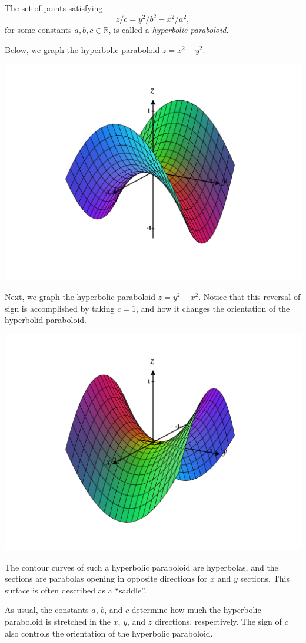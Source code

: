 \documentclass{ximera}
\begin{document}
\begin{example}
The set of points satisfying
\[
z/c = y^2/b^2 - x^2/a^2,
\]
for some constants $a,b,c\in\mathbb{R}$, is called a \emph{hyperbolic paraboloid}.

Below, we graph the hyperbolic paraboloid $z = x^2-y^2$.

\begin{image}
\includegraphics[width = \textwidth]{CalcPlot3D-hyper_para2}
\end{image}

Next, we graph the hyperbolic paraboloid $z=y^2-x^2$. Notice that this reversal of sign is accomplished by taking $c=1$, and how it changes the orientation of the hyperbolid paraboloid.

\begin{image}
\includegraphics[width = \textwidth]{CalcPlot3D-hyper_para1}
\end{image}

The contour curves of such a hyperbolic paraboloid are hyperbolas, and the sections are parabolas opening in opposite directions for $x$ and $y$ sections. This surface is often described as a ``saddle''.

As usual, the constants $a$, $b$, and $c$ determine how much the hyperbolic paraboloid is stretched in the $x$, $y$, and $z$ directions, respectively. The sign of $c$ also controls the orientation of the hyperbolic paraboloid.
\end{example}
\end{document}
